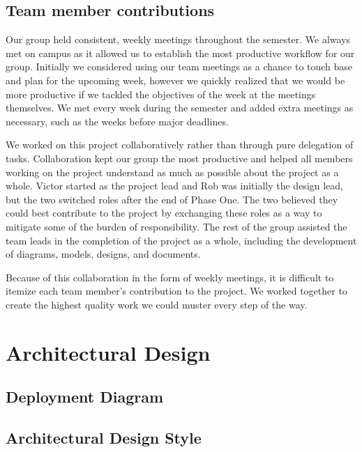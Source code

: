 \documentclass[a4paper]{report}
\begin{document}
\section[Contributors]{Team member contributions}

	Our group held consistent, weekly meetings throughout the semester. We always met on campus as it allowed us to establish the most productive workflow for our group. Initially we considered using our team meetings as a chance to touch base and plan for the upcoming week, however we quickly realized that we would be more productive if we tackled the objectives of the week at the meetings themselves. We met every week during the semester and added extra meetings as necessary, such as the weeks before major deadlines.

	We worked on this project collaboratively rather than through pure delegation of tasks. Collaboration kept our group the most productive and helped all members working on the project understand as much as possible about the project as a whole. Victor started as the project lead and Rob was initially the design lead, but the two switched roles after the end of Phase One. The two believed they could best contribute to the project by exchanging these roles as a way to mitigate some of the burden of responsibility. The rest of the group assisted the team leads in the completion of the project as a whole, including the development of diagrams, models, designs, and documents.

	Because of this collaboration in the form of weekly meetings, it is difficult to itemize each team member's contribution to the project. We worked together to create the highest quality work we could muster every step of the way. 

\chapter{Architectural Design}

\section{Deployment Diagram}

	\begin{center}
	\end{center}

	\pagebreak

\section{Architectural Design Style}
\end{document}
